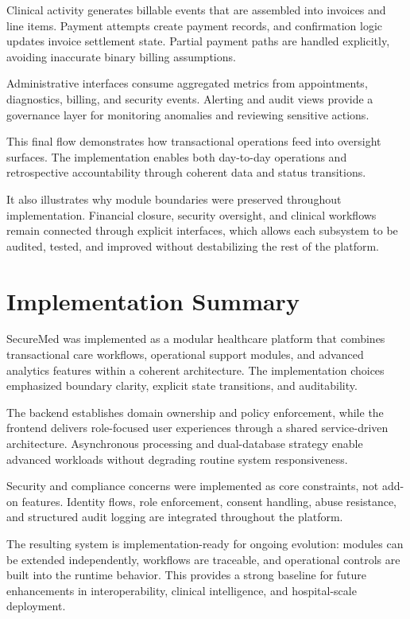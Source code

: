 Clinical activity generates billable events that are assembled into invoices and line items. Payment attempts create payment records, and confirmation logic updates invoice settlement state. Partial payment paths are handled explicitly, avoiding inaccurate binary billing assumptions.

Administrative interfaces consume aggregated metrics from appointments, diagnostics, billing, and security events. Alerting and audit views provide a governance layer for monitoring anomalies and reviewing sensitive actions.

This final flow demonstrates how transactional operations feed into oversight surfaces. The implementation enables both day-to-day operations and retrospective accountability through coherent data and status transitions.

It also illustrates why module boundaries were preserved throughout implementation. Financial closure, security oversight, and clinical workflows remain connected through explicit interfaces, which allows each subsystem to be audited, tested, and improved without destabilizing the rest of the platform.

\section{Implementation Summary}\label{517-implementation-summary}

SecureMed was implemented as a modular healthcare platform that combines transactional care workflows, operational support modules, and advanced analytics features within a coherent architecture. The implementation choices emphasized boundary clarity, explicit state transitions, and auditability.

The backend establishes domain ownership and policy enforcement, while the frontend delivers role-focused user experiences through a shared service-driven architecture. Asynchronous processing and dual-database strategy enable advanced workloads without degrading routine system responsiveness.

Security and compliance concerns were implemented as core constraints, not add-on features. Identity flows, role enforcement, consent handling, abuse resistance, and structured audit logging are integrated throughout the platform.

The resulting system is implementation-ready for ongoing evolution: modules can be extended independently, workflows are traceable, and operational controls are built into the runtime behavior. This provides a strong baseline for future enhancements in interoperability, clinical intelligence, and hospital-scale deployment.
